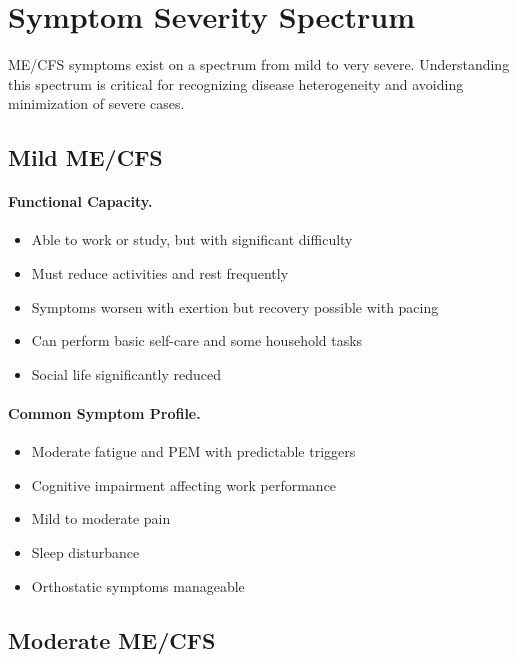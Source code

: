 \section{Symptom Severity Spectrum}
\label{sec:symptom-severity}

ME/CFS symptoms exist on a spectrum from mild to very severe. Understanding this spectrum is critical for recognizing disease heterogeneity and avoiding minimization of severe cases.

\subsection{Mild ME/CFS}
\label{subsec:mild-mecfs}

\paragraph{Functional Capacity.}
\begin{itemize}
    \item Able to work or study, but with significant difficulty
    \item Must reduce activities and rest frequently
    \item Symptoms worsen with exertion but recovery possible with pacing
    \item Can perform basic self-care and some household tasks
    \item Social life significantly reduced
\end{itemize}

\paragraph{Common Symptom Profile.}
\begin{itemize}
    \item Moderate fatigue and PEM with predictable triggers
    \item Cognitive impairment affecting work performance
    \item Mild to moderate pain
    \item Sleep disturbance
    \item Orthostatic symptoms manageable
\end{itemize}

\subsection{Moderate ME/CFS}
\label{subsec:moderate-mecfs}

